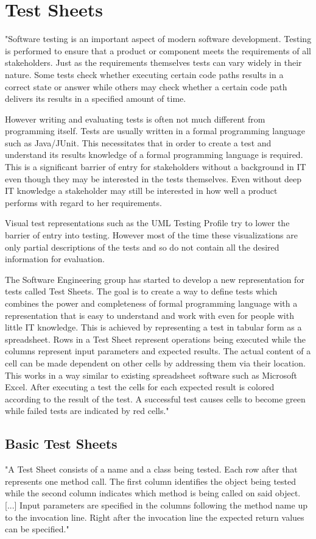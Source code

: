 \chapter{Test Sheets}
"Software testing is an important aspect of modern software development.
Testing is performed to ensure that a product or component meets the requirements of all stakeholders.
Just as the requirements themselves tests can vary widely in their nature.
Some tests check whether executing certain code paths results in a correct state or answer while others may check whether a certain code path delivers its results in a specified amount of time.

However writing and evaluating tests is often not much different from programming itself.
Tests are usually written in a formal programming language such as Java/JUnit.
This necessitates that in order to create a test and understand its results knowledge of a formal programming language is required.
This is a significant barrier of entry for stakeholders without a background in IT even though they may be interested in the tests themselves.
Even without deep IT knowledge a stakeholder may still be interested in how well a product performs with regard to her requirements.

Visual test representations such as the UML Testing Profile try to lower the barrier of entry into testing.
However most of the time these visualizations are only partial descriptions of the tests and so do not contain all the desired information for evaluation.

The Software Engineering group has started to develop a new representation for tests called Test Sheets.
The goal is to create a way to define tests which combines the power and completeness of formal programming language with a representation that is easy to understand and work with even for people with little IT knowledge.
This is achieved by representing a test in tabular form as a spreadsheet.
Rows in a Test Sheet represent operations being executed while the columns represent input parameters and expected results.
The actual content of a cell can be made dependent on other cells by addressing them via their location.
This works in a way similar to existing spreadsheet software such as Microsoft Excel.
After executing a test the cells for each expected result is colored according to the result of the test.
A successful test causes cells to become green while failed tests are indicated by red cells."\cite{ts}
 \section{Basic Test Sheets}
"A Test Sheet consists of a name and a class being tested. 
Each row after that represents one method call.
The first column identifies the object being tested while the second column indicates which method is being called on said object. [...]
Input parameters are specified in the columns following the method name up to the invocation line. 
Right after the invocation line the expected return values can be specified."\cite{tsb}

